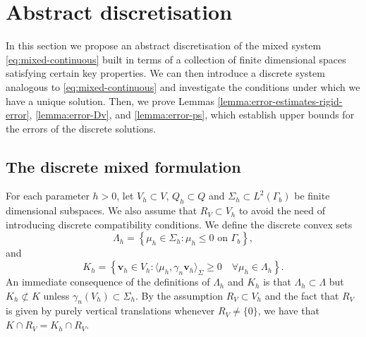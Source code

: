 \documentclass[onefignum,onetabnum]{siamart190516}
\newcommand{\bn}{\boldsymbol{n}}
\newcommand{\bu}{\boldsymbol{u}}
\newcommand{\bv}{\boldsymbol{v}}
\newtheorem{remark}[theorem]{Remark}
\begin{document}


\section{Abstract discretisation}\label{sec:abstract-discretisation}

In this section we propose an abstract discretisation of the mixed system \eqref{eq:mixed-continuous} built in terms of a collection of finite dimensional spaces satisfying certain key properties. We can then introduce a discrete system analogous to \eqref{eq:mixed-continuous} and investigate the conditions under which we have a unique solution. Then, we prove Lemmas \ref{lemma:error-estimates-rigid-error}, \ref{lemma:error-Dv}, and \ref{lemma:error-ps}, which establish upper bounds for the errors of the discrete solutions. 

\subsection{The discrete mixed formulation}

For each parameter $h > 0$, let $V_h\subset V$, $Q_h\subset Q$ and $\Sigma_h\subset L^2(\Gamma_b)$ be finite dimensional subspaces. We also assume that $R_V \subset V_h$ to avoid the need of introducing discrete compatibility conditions. We define the discrete convex sets
%
\[
	\Lambda_h = \left\lbrace \mu_h\in\Sigma_h : \mu_h \leq 0 \text{ on $\Gamma_b$} \right\rbrace,
\]
%
and
%
\[
	K_h = \left\lbrace \bv_h\in V_h : \langle \mu_h, \gamma_n \bv_h \rangle_\Sigma \geq 0 \quad \forall \mu_h\in\Lambda_h \right\rbrace.
\]
%
An immediate consequence of the definitions of $\Lambda_h$ and $K_h$ is that $\Lambda_h \subset \Lambda$ but $K_h \not\subset K$ unless $\gamma_n(V_h) \subset \Sigma_h$. By the assumption $R_V \subset V_h$ and the fact that $R_V$ is given by purely vertical translations whenever $R_V \neq \{ 0\}$, we have that $K \cap R_V = K_h \cap R_V$.
\end{document}
